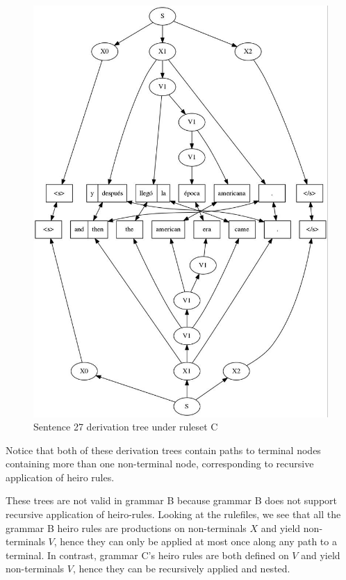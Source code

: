 \documentclass[a4paper,oneside,reqno]{amsart}
\begin{document}
\begin{enumerate}[label=\arabic*.]
\begin{figure}[H]
\begin{center}
        \includegraphics[scale=0.5]{../output/tree27Cdvn1.jpg}
      \end{center}
      \caption{Sentence 27 derivation tree under ruleset C}
      \label{fig:27-c-tree}
    \end{figure}
    Notice that both of these derivation trees contain paths to terminal nodes
    containing more than one non-terminal node, corresponding to recursive application
    of heiro rules.

    These trees are not valid in grammar B because grammar B does not support recursive
    application of heiro-rules. Looking at the rulefiles, we see that all the
    grammar B heiro rules are productions on non-terminals $X$ and yield
    non-terminals $V$, hence they can only be applied at most once along any
    path to a terminal. In contrast, grammar C's heiro rules are both defined
    on $V$ and yield non-terminals $V$, hence they can be recursively applied
    and nested.
\end{enumerate}

%
%


\end{document}

